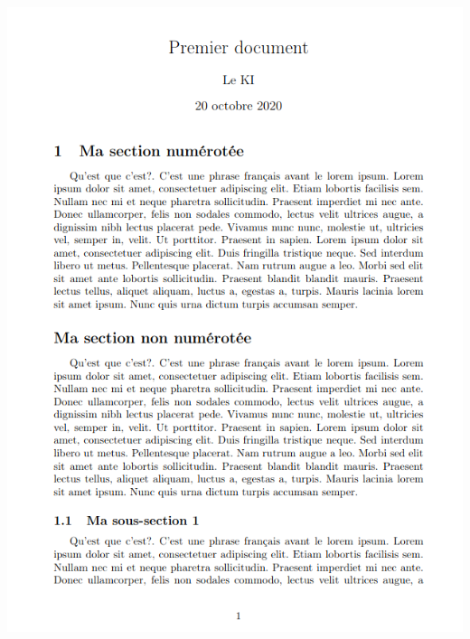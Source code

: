 \documentclass[handout]{beamer}
\begin{document}
\begin{frame}
	\hspace*{-0.5cm}
	\vspace*{-0.5cm}
	\begin{columns}
		\includegraphics[scale=0.3]{ressources/testsection}

\end{columns}
\end{frame}
\end{document}
